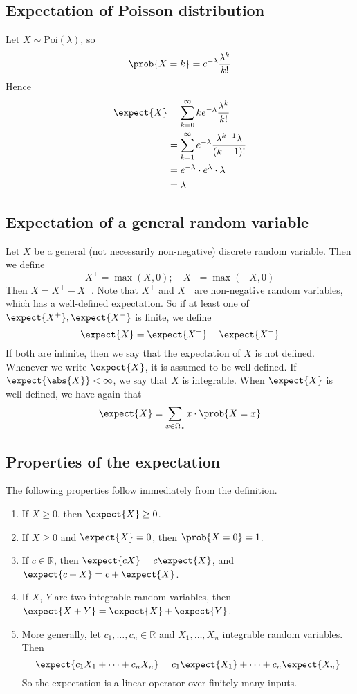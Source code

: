 \subsection{Expectation of Poisson distribution}
Let \(X \sim \text{Poi}(\lambda)\), so
\[
	\prob{X = k} = e^{-\lambda} \frac{\lambda^k}{k!}
\]
Hence
\begin{align*}
	\expect{X} & = \sum_{k=0}^\infty k e^{-\lambda} \frac{\lambda^k}{k!}              \\
	           & =\sum_{k=1}^\infty e^{-\lambda} \frac{\lambda^{k-1} \lambda}{(k-1)!} \\
	           & = e^{-\lambda} \cdot e^{\lambda} \cdot \lambda                       \\
	           & = \lambda
\end{align*}

\subsection{Expectation of a general random variable}
Let \(X\) be a general (not necessarily non-negative) discrete random variable.
Then we define
\[
	X^+ = \max(X, 0);\quad X^- = \max(-X, 0)
\]
Then \(X = X^+ - X^-\).
Note that \(X^+\) and \(X^-\) are non-negative random variables, which has a well-defined expectation.
So if at least one of \(\expect{X^+}, \expect{X^-}\) is finite, we define
\[
	\expect{X} = \expect{X^+} - \expect{X^-}
\]
If both are infinite, then we say that the expectation of \(X\) is not defined.
Whenever we write \(\expect{X}\), it is assumed to be well-defined.
If \(\expect{\abs{X}} < \infty\), we say that \(X\) is integrable.
When \(\expect{X}\) is well-defined, we have again that
\[
	\expect{X} = \sum_{x \in \Omega_x} x \cdot \prob{X = x}
\]

\subsection{Properties of the expectation}
The following properties follow immediately from the definition.
\begin{enumerate}
	\item If \(X \geq 0\), then \(\expect{X} \geq 0\).
	\item If \(X \geq 0\) and \(\expect{X} = 0\), then \(\prob{X = 0} = 1\).
	\item If \(c \in \mathbb R\), then \(\expect{cX} = c\expect{X}\), and \(\expect{c + X} = c + \expect{X}\).
	\item If \(X\), \(Y\) are two integrable random variables, then \(\expect{X + Y} = \expect{X} + \expect{Y}\).
	\item More generally, let \(c_1, \dots, c_n \in \mathbb R\) and \(X_1, \dots, X_n\) integrable random variables.
	      Then
	      \[
		      \expect{c_1X_1 + \dots + c_n X_n} = c_1 \expect{X_1} + \dots + c_n \expect{X_n}
	      \]
	      So the expectation is a linear operator over finitely many inputs.
\end{enumerate}

